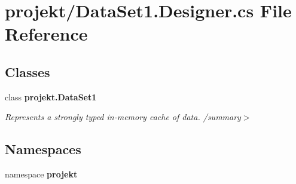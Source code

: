 \section{projekt/\+Data\+Set1.Designer.\+cs File Reference}
\label{DataSet1_8Designer_8cs}
\subsection*{Classes}
\begin{DoxyCompactItemize}
\item 
class \textbf{ projekt.\+Data\+Set1}
\begin{DoxyCompactList}\small\item\em Represents a strongly typed in-\/memory cache of data. /summary$>$ \end{DoxyCompactList}\end{DoxyCompactItemize}
\subsection*{Namespaces}
\begin{DoxyCompactItemize}
\item 
namespace \textbf{ projekt}
\end{DoxyCompactItemize}
